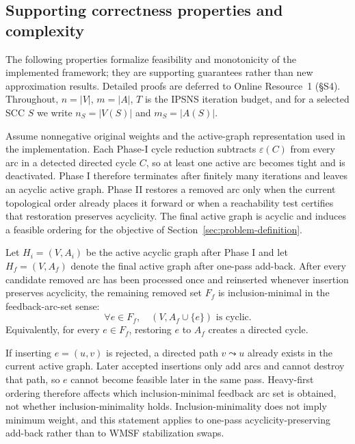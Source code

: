 \subsection{Supporting correctness properties and complexity}
\label{subsec:formal-analysis}

The following properties formalize feasibility and monotonicity of the implemented framework; they are supporting guarantees rather than new approximation results. Detailed proofs are deferred to Online Resource~1 (\S S4). Throughout, \(n=|V|\), \(m=|A|\), \(T\) is the IPSNS iteration budget, and for a selected SCC \(S\) we write \(n_S=|V(S)|\) and \(m_S=|A(S)|\).

\begin{proposition}
\label{prop:lrta-feasibility}
Assume nonnegative original weights and the active-graph representation used in the implementation. Each Phase-I cycle reduction subtracts \(\varepsilon(C)\) from every arc in a detected directed cycle \(C\), so at least one active arc becomes tight and is deactivated. Phase I therefore terminates after finitely many iterations and leaves an acyclic active graph. Phase II restores a removed arc only when the current topological order already places it forward or when a reachability test certifies that restoration preserves acyclicity. The final active graph is acyclic and induces a feasible ordering for the objective of Section~\ref{sec:problem-definition}.
\end{proposition}

\begin{proposition}
\label{prop:addback-correctness}
Let \(H_i=(V,A_i)\) be the active acyclic graph after Phase I and let \(H_f=(V,A_f)\) denote the final active graph after one-pass add-back. After every candidate removed arc has been processed once and reinserted whenever insertion preserves acyclicity, the remaining removed set \(F_f\) is inclusion-minimal in the feedback-arc-set sense:
\begin{equation}
    \forall e\in F_f,\quad (V,A_f\cup\{e\}) \text{ is cyclic}.
    \label{eq:addback-minimality}
\end{equation}
Equivalently, for every \(e\in F_f\), restoring \(e\) to \(A_f\) creates a directed cycle.

If inserting \(e=(u,v)\) is rejected, a directed path \(v\leadsto u\) already exists in the current active graph. Later accepted insertions only add arcs and cannot destroy that path, so \(e\) cannot become feasible later in the same pass. Heavy-first ordering therefore affects which inclusion-minimal feedback arc set is obtained, not whether inclusion-minimality holds. Inclusion-minimality does not imply minimum weight, and this statement applies to one-pass acyclicity-preserving add-back rather than to WMSF stabilization swaps.
\end{proposition}

